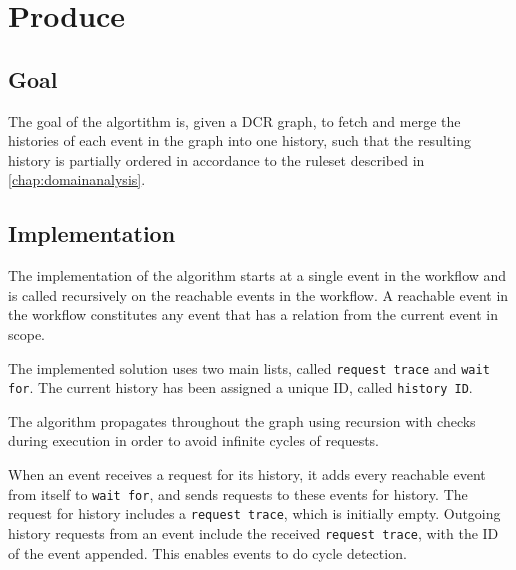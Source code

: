 \section{Produce}
\subsection{Goal} %
The goal of the algortithm is, given a DCR graph, to fetch and merge the histories of each event in the graph into one history, such that the resulting history is partially ordered in accordance to the ruleset described in \autoref{chap:domainanalysis}. 


\subsection{Implementation} %
The implementation of the algorithm starts at a single event in the workflow and is called recursively on the reachable events in the workflow. A reachable event in the workflow constitutes any event that has a relation from the current event in scope.  \bigskip

The implemented solution uses two main lists, called \texttt{request trace} and \texttt{wait for}. The current history has been assigned a unique ID, called \texttt{history ID}.

The algorithm propagates throughout the graph using recursion with checks during execution in order to avoid infinite cycles of requests. \bigskip

When an event receives a request for its history, it adds every reachable event from itself to \texttt{wait for}, and sends requests to these events for history. The request for history includes a \texttt{request trace}, which is initially empty. Outgoing history requests from an event include the received \texttt{request trace}, with the ID of the event appended. This enables events to do cycle detection. \bigskip

